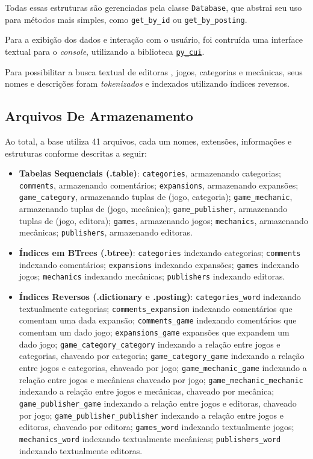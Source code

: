 \documentclass[hidelinks,12pt,article,twocolumn,brazil]{abntex2}
\newcommand{\mono}[1]{\texttt{#1}}
\begin{document}
Todas essas estruturas são gerenciadas pela classe \texttt{Database}, que abstrai seu uso para métodos mais simples, como \texttt{get\_by\_id} ou \texttt{get\_by\_posting}.

Para a exibição dos dados e interação com o usuário, foi contruída uma interface textual para o \textit{console}, utilizando a biblioteca \href{https://github.com/jwlodek/py_cui}{\texttt{py\_cui}}.

Para possibilitar a busca textual de editoras , jogos, categorias e mecânicas, seus nomes e descrições foram \textit{tokenizados} e indexados utilizando índices reversos.

\subsection{Arquivos De Armazenamento}

Ao total, a base utiliza 41 arquivos, cada um nomes, extensões, informações e estruturas conforme descritas a seguir:

\begin{itemize}
    \item \textbf{Tabelas Sequenciais (.table)}: \mono{categories}, armazenando categorias; \mono{comments}, armazenando comentários; \mono{expansions}, armazenando expansões; \mono{game\_category}, armazenando tuplas de (jogo, categoria); \mono{game\_mechanic}, armazenando tuplas de (jogo, mecânica); \mono{game\_publisher}, armazenando tuplas de (jogo, editora); \mono{games}, armazenando jogos; \mono{mechanics}, armazenando mecânicas; \mono{publishers}, armazenando editoras.

    \item \textbf{Índices em BTrees (.btree)}: \mono{categories} indexando categorias; \mono{comments} indexando comentários; \mono{expansions} indexando expansões; \mono{games} indexando jogos; \mono{mechanics} indexando mecânicas; \mono{publishers} indexando editoras.

    \item \textbf{Índices Reversos (.dictionary e .posting)}: \mono{categories\_word} indexando textualmente categorias; \mono{comments\_expansion} indexando comentários que comentam uma dada expansão; \mono{comments\_game} indexando comentários que comentam um dado jogo; \mono{expansions\_game} expansões que expandem um dado jogo; \mono{game\_category\_category} indexando a relação entre jogos e categorias, chaveado por categoria; \mono{game\_category\_game} indexando a relação entre jogos e categorias, chaveado por jogo; \mono{game\_mechanic\_game} indexando a relação entre jogos e mecânicas chaveado por jogo; \mono{game\_mechanic\_mechanic} indexando a relação entre jogos e mecânicas, chaveado por mecânica; \mono{game\_publisher\_game} indexando a relação entre jogos e editoras, chaveado por jogo; \mono{game\_publisher\_publisher} indexando a relação entre jogos e editoras, chaveado por editora; \mono{games\_word} indexando textualmente jogos; \mono{mechanics\_word} indexando textualmente mecânicas; \mono{publishers\_word} indexando textualmente editoras.
\end{itemize}
\end{document}
